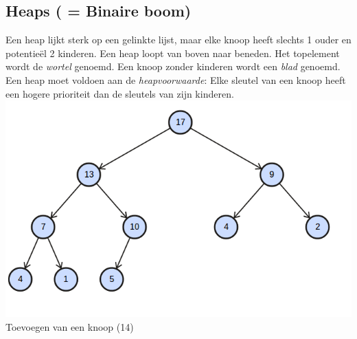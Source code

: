 \documentclass[12pt]{report}
\begin{document}
\subsection{Heaps ( = Binaire boom)}
Een heap lijkt sterk op een gelinkte lijst, maar elke knoop heeft slechts 1 ouder en potentieël 2 kinderen. Een heap loopt van boven naar beneden. Het topelement wordt de \textit{wortel} genoemd. Een knoop zonder kinderen wordt een \textit{blad} genoemd. Een heap moet voldoen aan de \textit{heapvoorwaarde}: Elke sleutel van een knoop heeft een hogere prioriteit dan de sleutels van zijn kinderen.
\includegraphics{heap_1}
Toevoegen van een knoop (14)
\end{document}
